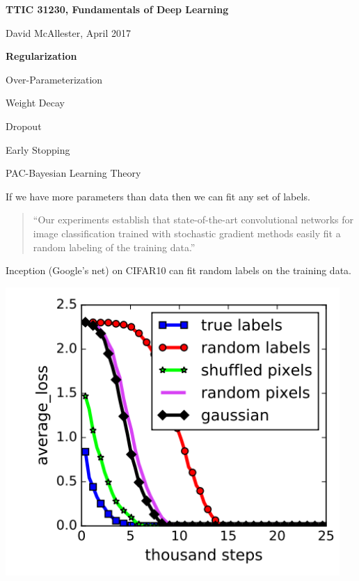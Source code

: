 



{\Huge


\centerline{\bf TTIC 31230, Fundamentals of Deep Learning}
\bigskip
\centerline{David McAllester, April 2017}

\vfill
\centerline{\bf Regularization}
\vfill
\vfill
\centerline{Over-Parameterization}
\vfill
\centerline{Weight Decay}
\vfill
\centerline{Dropout}
\vfill
\centerline{Early Stopping}
\vfill
\centerline{PAC-Bayesian Learning Theory}

\vfill
\centerline{}

If we have more parameters than data then we can fit any set of labels.

\vfill
\begin{quotation}
``Our experiments establish that state-of-the-art convolutional networks
for image classification trained with stochastic gradient methods easily fit a random
labeling of the training data.''
\end{quotation}

\vfill
{}


Inception (Google's net) on CIFAR10 can fit random labels on the training data.

\vfill
\centerline{\includegraphics[width = 5in]{../images/RandomLabels1}}


}
